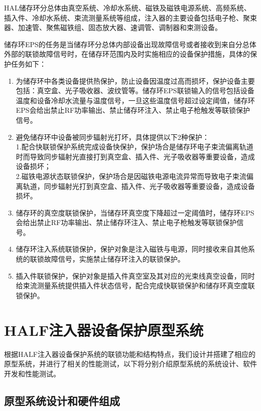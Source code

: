 HAL储存环分总体由真空系统、冷却水系统、磁铁及磁铁电源系统、高频系统、插入件、冷却水系统、束流测量系统等组成，注入器的主要设备包括电子枪、聚束器、加速管、聚焦磁铁组、固态放大器、速调管、调制器和束测设备。




储存环EPS的任务是当储存环分总体内部设备出现故障信号或者接收到来自分总体外部的联锁故障信号时，在储存环范围内及时实施相应的设备保护措施，具体的保护任务如下：

\begin{enumerate}
  \item 为储存环中各类设备提供热保护，防止设备因温度过高而损坏，保护设备主要包括：真空盒、光子吸收器、波纹管等。储存环EPS联锁输入的信号包括设备温度和设备冷却水流量与温度信号，一旦这些温度信号超过设定阈值，储存环EPS会给出禁止RF功率输出、禁止储存环注入、禁止电子枪触发等联锁保护信号。

  \item 避免储存环中设备被同步辐射光打坏，具体提供以下2种保护：\\
  1.配合快联锁保护系统完成设备快保护，保护场合是储存环电子束流偏离轨道时而导致同步辐射光直接打到真空盒、插入件、光子吸收器等重要设备，造成设备损坏；\\
  2.磁铁电源状态联锁保护，保护场合是因磁铁电源电流异常而导致电子束流偏离轨道，同步辐射光打到真空盒、插入件、光子吸收器等重要设备，造成设备损坏。

  \item 储存环的真空度联锁保护，当储存环真空度下降超过一定阈值时，储存环EPS会给出禁止RF功率输出、禁止储存环注入、禁止电子枪触发等联锁保护信号。

  \item 储存环注入系统联锁保护，保护对象是注入磁铁与电源，同时接收来自其他系统的联锁故障信号，实施禁止储存环注入的联锁保护。

  \item 插入件联锁保护，保护对象是插入件真空室及其对应的光束线真空设备，同时给束流测量系统提供插入件状态信号，配合完成快联锁保护和储存环真空度联锁保护。
\end{enumerate}

\section{HALF注入器设备保护原型系统}

根据HALF注入器设备保护系统的联锁功能和结构特点，我们设计并搭建了相应的原型系统，并进行了相关的性能测试，以下将分别介绍原型系统的系统设计、软件开发和性能测试。

\subsection{原型系统设计和硬件组成}

